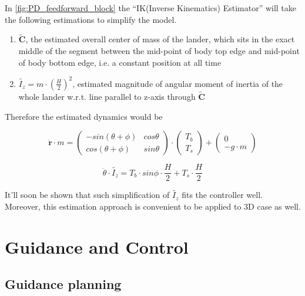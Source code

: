 \documentclass[notitlepage,twocolumn,10pt]{article}
\begin{document}
In \cref{fig:PD_feedforward_block} the ``IK(Inverse Kinematics) Estimator'' will take the following estimations to simplify the model.
\begin{enumerate}[label=\textbf{b.\arabic*}, itemsep=2pt]
    \item \label{eqs:C} $\tilde{\mathbf{C}}$, the estimated overall center of mass of the lander, which sits in the exact middle of the segment between the mid-point of body top edge and mid-point of body bottom edge, i.e. a constant position at all time
    \item \label{eqs:Iz} $\tilde{I_z} = m \cdot (\frac{H}{2})^2$, estimated magnitude of angular moment of inertia of the whole lander w.r.t. line parallel to z-axis through $\tilde{\mathbf{C}}$
\end{enumerate}

Therefore the estimated dynamics would be

\begin{equation} \label{eqs:accLinear}
\ddot{\mathbf{r}} \cdot m= \begin{pmatrix}
    -sin(\theta + \phi) & cos\theta \\
    cos(\theta + \phi) & sin\theta
\end{pmatrix} \cdot \begin{pmatrix}
  T_{b} \\
  T_{s} 
\end{pmatrix} + \begin{pmatrix} 
    0 \\
    - g \cdot m
\end{pmatrix}
\end{equation}

\begin{equation} \label{eqs:accIznewton}
\ddot{\theta} \cdot \tilde{I_z} = T_{b} \cdot sin\phi \cdot \frac{H}{2} + T_{s} \cdot \frac{H}{2}
\end{equation}

It'll soon be shown that such simplification of $\tilde{I_z}$ fits the controller well. Moreover, this estimation approach is convenient to be applied to 3D case as well. 


\section{Guidance and Control} \label{sec:gdc}
\subsection{Guidance planning} \label{sec:gdp}
\end{document}
